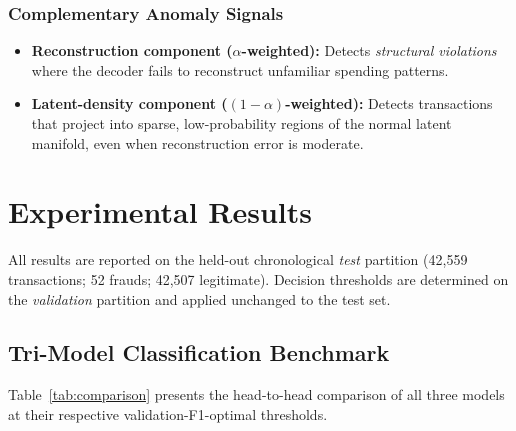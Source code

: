 \documentclass[conference,10pt]{IEEEtran}
\begin{document}
\subsubsection{Complementary Anomaly Signals}
\begin{itemize}[leftmargin=*]
\item \textbf{Reconstruction component ($\alpha$-weighted):}  Detects
      \emph{structural violations} where the decoder fails to reconstruct
      unfamiliar spending patterns.
\item \textbf{Latent-density component ($(1\!-\!\alpha)$-weighted):}  Detects
      transactions that project into sparse, low-probability regions of the
      normal latent manifold, even when reconstruction error is moderate.
\end{itemize}

\section{Experimental Results}
\label{sec:results}

All results are reported on the held-out chronological \emph{test} partition
(42,559 transactions; 52 frauds; 42,507 legitimate).  Decision thresholds
are determined on the \emph{validation} partition and applied unchanged to
the test set.

\subsection{Tri-Model Classification Benchmark}
Table~\ref{tab:comparison} presents the head-to-head comparison of all three
models at their respective validation-F1-optimal thresholds.
\end{document}
